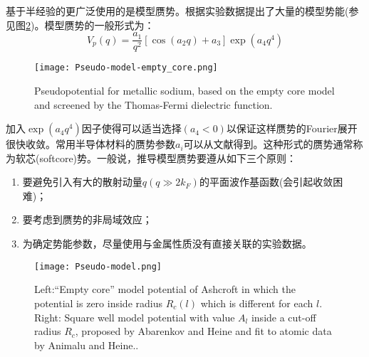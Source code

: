 基于半经验的更广泛使用的是模型赝势。根据实验数据提出了大量的模型势能\cite{PM9-451_1964,PM12-529_1965,JPF2-270_1972,PRB11-2717_1975,PRB11-2726_1975,JPF6-L271_1976,PR174-769_1968}(参见图\ref{Pseudo-model})。模型赝势的一般形式为：
\begin{equation}
  V_p(q)=\frac{a_1}{q^2}[\cos(a_2q)+a_3]\exp(a_4q^4)
  \label{eq:solid-102}
\end{equation}
\begin{figure}[h!]
\centering
\texttt{[image: Pseudo-model-empty\_core.png]}
\caption{\small \textrm{Pseudopotential for metallic sodium, based on the empty core model and screened by the Thomas-Fermi dielectric function.}}%
\label{Pseudo_model-empty_core}
\end{figure}
加入$\exp(a_4q^4)$因子使得可以适当选择$(a_4<0)$以保证这样赝势的Fourier展开很快收敛。常用半导体材料的赝势参数$a_i$可以从文献\cite{PRB15-2154_1977}得到。这种形式的赝势通常称为软芯(softcore)势。一般说，推导模型赝势要遵从如下三个原则：
\begin{enumerate}
  \item 
要避免引入有大的散射动量$q(q\gg 2k_F)$的平面波作基函数(会引起收敛困难)；%
  \item 
要考虑到赝势的非局域效应；
  \item 
为确定势能参数，尽量使用与金属性质没有直接关联的实验数据。
\end{enumerate}
\begin{figure}[h!]
\centering
\texttt{[image: Pseudo-model.png]}
\caption{\small \textrm{Left:``Empty core'' model potential of Ashcroft in which the potential is zero inside radius $R_c(l)$ which is different for each $l$. Right: Square well model potential with value $A_l$ inside a cut-off radius $R_c$, proposed by Abarenkov and Heine and fit to atomic data by Animalu and Heine..}}%
\label{Pseudo-model}
\end{figure}

